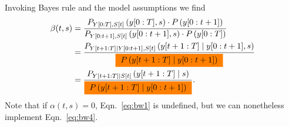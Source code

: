 Invoking Bayes rule and the model assumptions we find
\begin{align}
  \mlabel{eq:bw2} \beta(t,s) &= \frac{P_{\ts{Y}{0}{T},\ti{S}{t}}
    \left(\ts{y}{0}{T},s \right)\cdot P \left(\ts{y}{0}{t+1} \right)}
  {P_{\ts{Y}{0}{t+1},\ti{S}{t}}
    \left(\ts{y}{0}{t+1},s \right)\cdot P \left(\ts{y}{0}{T} \right)}\\
  \mlabel{eq:bw3} &= \frac{P_{\ts{Y}{t+1}{T}\given \ts{Y}{0}{t+1},\ti{S}{t}}
    \left(\ts{y}{t+1}{T}\given \ts{y}{0}{t+1},s \right)} {\FuturePast}\\
  \label{eq:bw4}
  & = \frac{P_{\ts{Y}{t+1}{T}\given \ti{S}{t}} \left(\ts{y}{t+1}{T}\given s
    \right)} {\FuturePast}.
\end{align}
Note that if $\alpha(t,s)=0$, Eqn.~\eqref{eq:bw1} is undefined, but
we can nonetheless implement Eqn.~\eqref{eq:bw4}.

